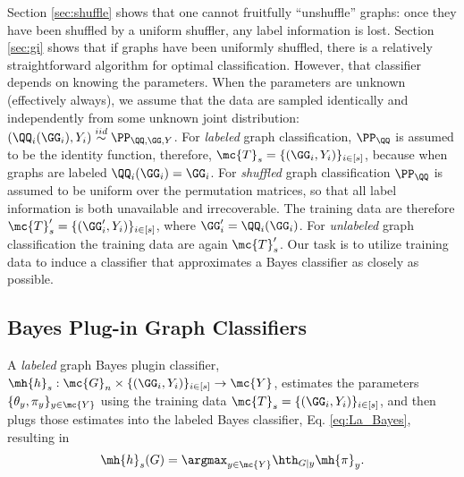 \documentclass[10pt,journal,cspaper,compsoc]{IEEEtran}
\begin{document}
Section \ref{sec:shuffle} shows that one cannot fruitfully ``unshuffle'' graphs: once they have been shuffled by a uniform shuffler, any label information is lost.  Section \ref{sec:gi} shows that if graphs have been uniformly shuffled, there is a relatively straightforward algorithm for optimal classification. However, that classifier depends on knowing the parameters.
When the parameters are unknown (effectively always), we assume that the data are sampled identically and independently from some unknown joint distribution: $(\QQ_i(\GG_i),Y_i)\overset{iid}{\sim}\PP_{\QQ,\GG,Y}$.  
For \emph{labeled} graph classification, $\PP_{\QQ}$ is assumed to be the identity function, therefore, $\mc{T}_s=\{(\GG_i,Y_i)\}_{i \in [s]}$, because when graphs are labeled $\QQ_i(\GG_i)=\GG_i$.
For \emph{shuffled} graph classification $\PP_{\QQ}$ is assumed to be uniform over the permutation matrices, so that all label information is both unavailable and irrecoverable.  The training data are therefore $\mc{T}_s'=\{(\GG_i',Y_i)\}_{i \in [s]}$, where $\GG_i'=\QQ_i(\GG_i)$.  For \emph{unlabeled} graph classification the training data are again $\mc{T}_s'$. 
Our task is to utilize training data to induce a classifier
that approximates 
a Bayes classifier
as closely as possible.  



\subsection{Bayes Plug-in Graph Classifiers} %
\label{sec:bayes_optimal_graph_invariant_based_classifier}



A \emph{labeled} graph Bayes plugin classifier,
$\mh{h}_s: \mc{G}_n \times \{(\GG_i,Y_i)\}_{i \in [s]} \to \mc{Y}$,
estimates the parameters $\{\theta_y,\pi_y\}_{y \in \mc{Y}}$ using the training data $\mc{T}_s=\{(\GG_i,Y_i)\}_{i \in [s]}$, and then plugs those estimates into the labeled Bayes classifier, Eq. \eqref{eq:La_Bayes}, resulting in
\begin{align} \label{eq:La_Plug}
	\mh{h}_s(G)=\argmax_{y\in\mc{Y}} \hth_{G|y}\mh{\pi}_y.
\end{align}
\end{document}
